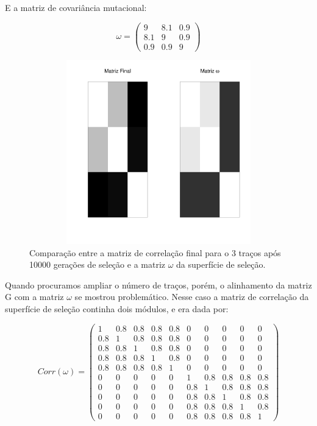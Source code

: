 E a matriz de covariância mutacional: 

\begin{equation}
\omega = \left( \begin{smallmatrix} 9 & 8.1 & 0.9\\  8.1 & 9 & 0.9 \\ 0.9 & 0.9 & 9 \end{smallmatrix}  \right)
\end{equation}

\begin{center}
\begin{figure}[htbp]
  \includegraphics[width=150mm, height=80mm]{figuras/Mat3tracos}
   \caption{Comparação entre a matriz de correlação final para o 3
   traços após 10000
   gerações de seleção e a matriz $\omega$ da superfície de seleção.}
  \label{MatJones3tracos}
\end{figure}
\end{center}

Quando procuramos ampliar o número de traços, porém, o alinhamento da
matriz G com a matriz $\omega$ se mostrou problemático. 
Nesse caso a matriz de correlação da superfície de seleção continha dois
módulos, e era dada por:

\begin{equation}
Corr(\omega) = \left( 
\begin{smallmatrix} 
1 & 0.8 & 0.8 & 0.8 & 0.8 & 0 & 0 & 0 & 0 & 0\\  
0.8 & 1 & 0.8 & 0.8 & 0.8 & 0 & 0 & 0 & 0 & 0\\  
0.8 & 0.8 & 1 & 0.8 & 0.8 & 0 & 0 & 0 & 0 & 0\\  
0.8 & 0.8 & 0.8 & 1 & 0.8 & 0 & 0 & 0 & 0 & 0\\  
0.8 & 0.8 & 0.8 & 0.8 & 1 & 0 & 0 & 0 & 0 & 0\\  
0 & 0 & 0 & 0 & 0 & 1 & 0.8 & 0.8 & 0.8 & 0.8\\ 
0 & 0 & 0 & 0 & 0 & 0.8 & 1 & 0.8 & 0.8 & 0.8\\
0 & 0 & 0 & 0 & 0 & 0.8 & 0.8 & 1 & 0.8 & 0.8\\
0 & 0 & 0 & 0 & 0 & 0.8 & 0.8 & 0.8 & 1 & 0.8\\
0 & 0 & 0 & 0 & 0 & 0.8 & 0.8 & 0.8 & 0.8 & 1
\end{smallmatrix}  \right)
\label{matw}
\end{equation}

